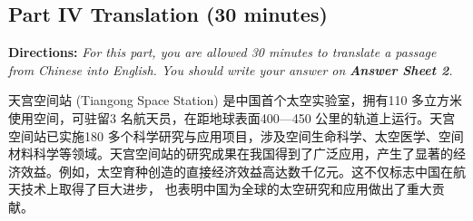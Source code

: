 \documentclass[UTF8,11pt]{ctexart}
\begin{document}
\subsection*{\textbf{Part IV Translation} \textbf{(30 minutes)}}


\textbf{Directions: }\textit{For this part, you are allowed 30 minutes to translate a passage from Chinese into English. You should} \textit{write your answer on }\textbf{\textit{Answer Sheet 2}}\textit{.}


天宫空间站 (Tiangong Space Station) 是中国首个太空实验室，拥有110 多立方米使用空间，可驻留3 名航天员，在距地球表面400—450 公里的轨道上运行。天宫空间站已实施180 多个科学研究与应用项目，涉及空间生命科学、太空医学、空间材料科学等领域。天宫空间站的研究成果在我国得到了广泛应用，产生了显著的经济效益。例如，太空育种创造的直接经济效益高达数千亿元。这不仅标志中国在航天技术上取得了巨大进步， 也表明中国为全球的太空研究和应用做出了重大贡献。
\end{document}
